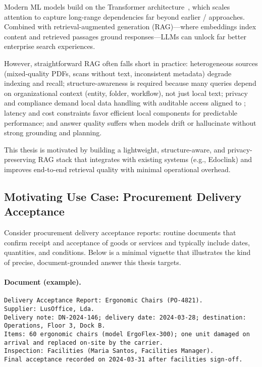 Modern \gls{ML} models build on the Transformer architecture~\cite{vaswani2017attention}, which scales attention to capture long-range dependencies far beyond earlier / approaches. Combined with retrieval-augmented generation (\gls{RAG})—where embeddings index content and retrieved passages ground responses—\glspl{LLM} can unlock far better enterprise search experiences.

However, straightforward \gls{RAG} often falls short in practice: heterogeneous sources (mixed-quality PDFs, scans without text, inconsistent metadata) degrade indexing and recall; structure-awareness is required because many queries depend on organizational context (entity, folder, workflow), not just local text; privacy and compliance demand local data handling with auditable access aligned to ; latency and cost constraints favor efficient local components for predictable performance; and answer quality suffers when models drift or hallucinate without strong grounding and planning.

This thesis is motivated by building a lightweight, structure-aware, and privacy-preserving \gls{RAG} stack that integrates with existing systems (e.g., Edoclink) and improves end-to-end retrieval quality with minimal operational overhead.

\subsection{Motivating Use Case: Procurement Delivery Acceptance}
\label{subsec:motivation-usecase}%
Consider procurement delivery acceptance reports: routine documents that confirm receipt and acceptance of goods or services and typically include dates, quantities, and conditions. Below is a minimal vignette that illustrates the kind of precise, document-grounded answer this thesis targets.

\paragraph{Document (example).}\mbox{}\par
\begin{lstlisting}[breaklines=true]
Delivery Acceptance Report: Ergonomic Chairs (PO-4821).
Supplier: LusOffice, Lda.
Delivery note: DN-2024-146; delivery date: 2024-03-28; destination: Operations, Floor 3, Dock B.
Items: 60 ergonomic chairs (model ErgoFlex-300); one unit damaged on arrival and replaced on-site by the carrier.
Inspection: Facilities (Maria Santos, Facilities Manager).
Final acceptance recorded on 2024-03-31 after facilities sign-off.
\end{lstlisting}

